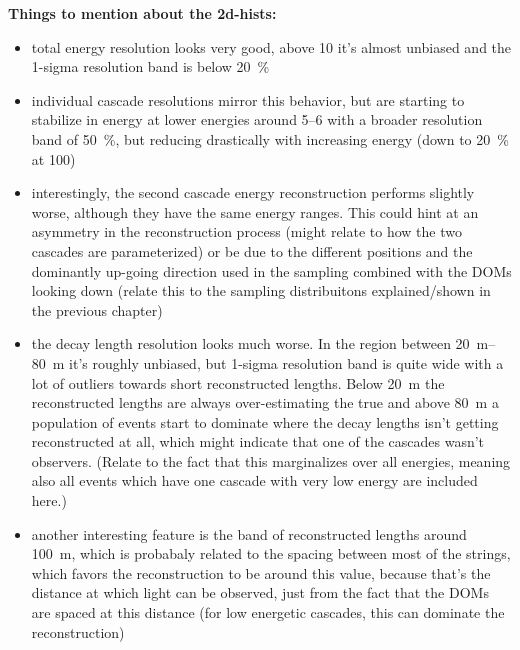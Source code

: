\textbf{Things to mention about the 2d-hists:}
\begin{itemize}
    \item total energy resolution looks very good, above \SI{10}{\gev} it's almost unbiased and the 1-sigma resolution band is below \SI{20}{\percent}
    \item individual cascade resolutions mirror this behavior, but are starting to stabilize in energy at lower energies around \SIrange{5}{6}{\gev} with a broader resolution band of \SI{50}{\percent}, but reducing drastically with increasing energy (down to \SI{20}{\percent} at \SI{100}{\gev})
    \item interestingly, the second cascade energy reconstruction performs slightly worse, although they have the same energy ranges. This could hint at an asymmetry in the reconstruction process (might relate to how the two cascades are parameterized) or be due to the different positions and the dominantly up-going direction used in the sampling combined with the DOMs looking down (relate this to the sampling distribuitons explained/shown in the previous chapter)
    \item the decay length resolution looks much worse. In the region between \SIrange[range-phrase={~and~}]{20}{80}{\meter} it's roughly unbiased, but 1-sigma resolution band is quite wide with a lot of outliers towards short reconstructed lengths. Below \SI{20}{\meter} the reconstructed lengths are always over-estimating the true and above \SI{80}{\meter} a population of events start to dominate where the decay lengths isn't getting reconstructed at all, which might indicate that one of the cascades wasn't observers. (Relate to the fact that this marginalizes over all energies, meaning also all events which have one cascade with very low energy are included here.)
    \item another interesting feature is the band of reconstructed lengths around \SI{100}{\meter}, which is probabaly related to the spacing between most of the strings, which favors the reconstruction to be around this value, because that's the distance at which light can be observed, just from the fact that the DOMs are spaced at this distance (for low energetic cascades, this can dominate the reconstruction)
\end{itemize}


